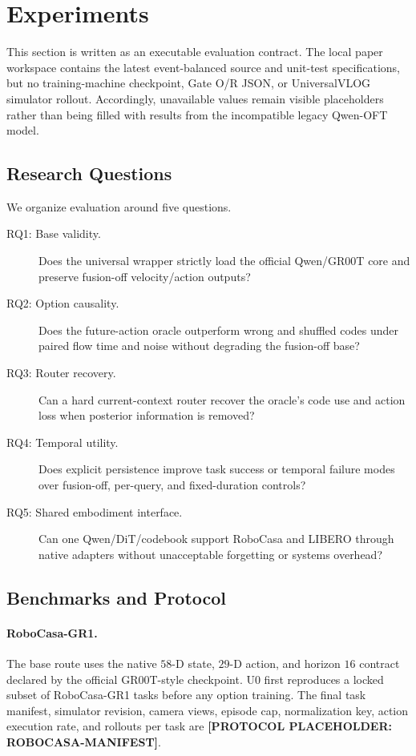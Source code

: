 \section{Experiments}

This section is written as an executable evaluation contract.  The local paper
workspace contains the latest event-balanced source and unit-test
specifications, but no training-machine checkpoint, Gate O/R JSON, or
UniversalVLOG simulator rollout.  Accordingly, unavailable values remain
visible placeholders rather than being filled with results from the
incompatible legacy Qwen-OFT model.



\subsection{Research Questions}

We organize evaluation around five questions.
\begin{description}
    \item[RQ1: Base validity.] Does the universal wrapper strictly load the
    official Qwen/GR00T core and preserve fusion-off velocity/action outputs?
    \item[RQ2: Option causality.] Does the future-action oracle outperform
    wrong and shuffled codes under paired flow time and noise without
    degrading the fusion-off base?
    \item[RQ3: Router recovery.] Can a hard current-context router recover the
    oracle's code use and action loss when posterior information is removed?
    \item[RQ4: Temporal utility.] Does explicit persistence improve task success
    or temporal failure modes over fusion-off, per-query, and fixed-duration
    controls?
    \item[RQ5: Shared embodiment interface.] Can one Qwen/DiT/codebook support
    RoboCasa and LIBERO through native adapters without unacceptable forgetting
    or systems overhead?
\end{description}



\subsection{Benchmarks and Protocol}

\paragraph{RoboCasa-GR1.}
The base route uses the native \(58\)-D state, \(29\)-D action, and horizon
\(16\) contract declared by the official GR00T-style checkpoint.  U0 first
reproduces a locked subset of RoboCasa-GR1 tasks before any option training.
The final task manifest, simulator revision, camera views, episode cap,
normalization key, action execution rate, and rollouts per task are
\textbf{[PROTOCOL PLACEHOLDER: ROBOCASA-MANIFEST]}.

